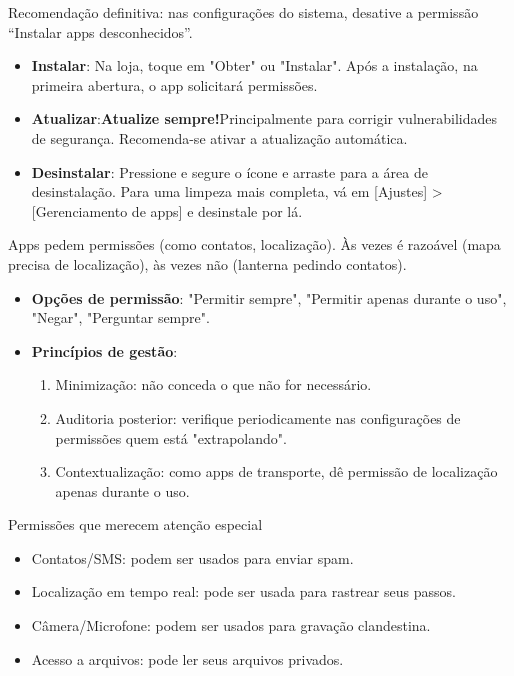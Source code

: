 Recomendação definitiva: nas configurações do sistema, desative a permissão “Instalar apps desconhecidos”.


\begin{itemize}
  \item \textbf{Instalar}: Na loja, toque em "Obter" ou "Instalar". Após a instalação, na primeira abertura, o app solicitará permissões.
  \item \textbf{Atualizar}:\textbf{Atualize sempre!}Principalmente para corrigir vulnerabilidades de segurança. Recomenda-se ativar a atualização automática.
  \item \textbf{Desinstalar}: Pressione e segure o ícone e arraste para a área de desinstalação. Para uma limpeza mais completa, vá em [Ajustes] > [Gerenciamento de apps] e desinstale por lá.
\end{itemize}


Apps pedem permissões (como contatos, localização). Às vezes é razoável (mapa precisa de localização), às vezes não (lanterna pedindo contatos).

\begin{itemize}
  \item \textbf{Opções de permissão}: "Permitir sempre", "Permitir apenas durante o uso", "Negar", "Perguntar sempre".
  \item \textbf{Princípios de gestão}:
  \begin{enumerate}
    \item Minimização: não conceda o que não for necessário.
    \item Auditoria posterior: verifique periodicamente nas configurações de permissões quem está "extrapolando".
    \item Contextualização: como apps de transporte, dê permissão de localização apenas durante o uso.
  \end{enumerate}
\end{itemize}

\begin{tcbwarn}{Permissões que merecem atenção especial}
\begin{itemize}
  \item Contatos/SMS: podem ser usados para enviar spam.
  \item Localização em tempo real: pode ser usada para rastrear seus passos.
  \item Câmera/Microfone: podem ser usados para gravação clandestina.
  \item Acesso a arquivos: pode ler seus arquivos privados.
\end{itemize}

\end{tcbwarn}

